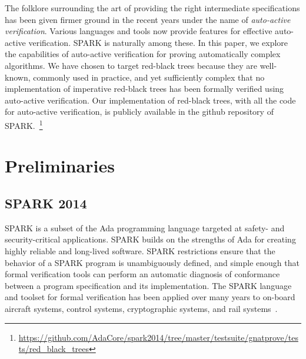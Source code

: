 \documentclass{llncs}
\newcommand{\spark}{SPARK\xspace}
\begin{document}
The folklore surrounding the art of providing the right intermediate
specifications has been given firmer ground in the recent years under the name
of \emph{auto-active verification}. Various languages and tools now provide
features for effective auto-active verification. SPARK is naturally among
these. In this paper, we explore the capabilities of auto-active verification
for proving automatically complex algorithms. We have chosen to target
red-black trees because they are well-known, commonly used in practice, and yet
sufficiently complex that no implementation of imperative red-black trees has
been formally verified using auto-active verification. Our implementation of
red-black trees, with all the code for auto-active verification, is publicly
available in the github repository of
SPARK.~\footnote{\url{https://github.com/AdaCore/spark2014/tree/master/testsuite/gnatprove/tests/red_black_trees}}




\section{Preliminaries}
\subsection{\spark 2014}

\spark is a subset of the Ada programming language targeted at safety-
and security-critical applications. \spark builds on the strengths of
Ada for creating highly reliable and long-lived software. \spark
restrictions ensure that the behavior of a \spark program is
unambiguously defined, and simple enough that formal verification
tools can perform an automatic diagnosis of conformance between a
program specification and its implementation. The \spark language and
toolset for formal verification has been applied over many years to
on-board aircraft systems, control systems, cryptographic systems, and
rail systems~\cite{oneill2012}.
\end{document}

